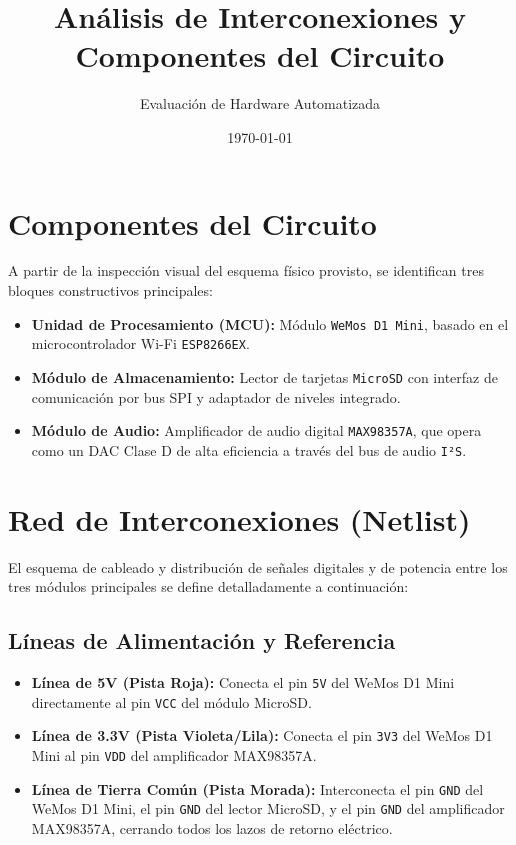 \documentclass[11pt,a4paper]{article}
\begin{document}
\title{\textbf{Análisis de Interconexiones y Componentes del Circuito}}
\author{Evaluación de Hardware Automatizada}
\date{\today}
\maketitle

\section{Componentes del Circuito}
A partir de la inspección visual del esquema físico provisto, se identifican tres bloques constructivos principales:

\begin{itemize}
    \item \textbf{Unidad de Procesamiento (MCU):} Módulo \texttt{WeMos D1 Mini}, basado en el microcontrolador Wi-Fi \texttt{ESP8266EX}.
    \item \textbf{Módulo de Almacenamiento:} Lector de tarjetas \texttt{MicroSD} con interfaz de comunicación por bus SPI y adaptador de niveles integrado.
    \item \textbf{Módulo de Audio:} Amplificador de audio digital \texttt{MAX98357A}, que opera como un DAC Clase D de alta eficiencia a través del bus de audio \texttt{I²S}.
\end{itemize}

\section{Red de Interconexiones (Netlist)}
El esquema de cableado y distribución de señales digitales y de potencia entre los tres módulos principales se define detalladamente a continuación:

\subsection{Líneas de Alimentación y Referencia}
\begin{itemize}
    \item \textbf{Línea de 5V (Pista Roja):} Conecta el pin \texttt{5V} del WeMos D1 Mini directamente al pin \texttt{VCC} del módulo MicroSD.
    \item \textbf{Línea de 3.3V (Pista Violeta/Lila):} Conecta el pin \texttt{3V3} del WeMos D1 Mini al pin \texttt{VDD} del amplificador MAX98357A.
    \item \textbf{Línea de Tierra Común (Pista Morada):} Interconecta el pin \texttt{GND} del WeMos D1 Mini, el pin \texttt{GND} del lector MicroSD, y el pin \texttt{GND} del amplificador MAX98357A, cerrando todos los lazos de retorno eléctrico.
\end{itemize}
\end{document}
